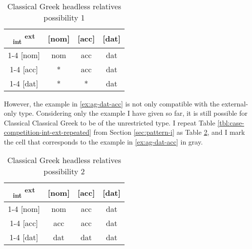 \begin{table}[ht]
  \center
  \caption{Classical Greek headless relatives possibility 1}
  \begin{tabular}{c|c|c|c}
    \toprule
    \textsubscript{\ac{int}} \textsuperscript{\ac{ext}}
           & [\ac{nom}]
           & [\ac{acc}]
           & [\ac{dat}]
           \\ \cmidrule{1-4}
       [\ac{nom}]
           & \ac{nom}
           & \ac{acc}
           & \ac{dat}
           \\ \cmidrule{1-4}
       [\ac{acc}]
           & *
           & \ac{acc}
           & \cellcolor{LG}\ac{dat}
           \\ \cmidrule{1-4}
       [\ac{dat}]
           & *
           & *
           & \ac{dat}
           \\
     \bottomrule
  \end{tabular}
    \label{tbl:case-competition-ag-poss1}
\end{table}

However, the example in \ref{ex:ag-dat-acc} is not only compatible with the external-only type. Considering only the example I have given so far, it is still possible for Classical Classical Greek to be of the unrestricted type. I repeat Table \ref{tbl:case-competition-int-ext-repeated} from Section \ref{sec:pattern-i} as Table \ref{tbl:case-competition-ag-poss2}, and I mark the cell that corresponds to the example in \ref{ex:ag-dat-acc} in gray.

\begin{table}[ht]
  \center
  \caption{Classical Greek headless relatives possibility 2}
  \begin{tabular}{c|c|c|c}
    \toprule
    \textsubscript{\ac{int}} \textsuperscript{\ac{ext}}
           & [\ac{nom}]
           & [\ac{acc}]
           & [\ac{dat}]
           \\ \cmidrule{1-4}
       [\ac{nom}]
           & \ac{nom}
           & \ac{acc}
           & \ac{dat}
           \\ \cmidrule{1-4}
       [\ac{acc}]
           & \ac{acc}
           & \ac{acc}
           & \cellcolor{LG}\ac{dat}
           \\ \cmidrule{1-4}
       [\ac{dat}]
           & \ac{dat}
           & \ac{dat}
           & \ac{dat}
           \\
     \bottomrule
  \end{tabular}
    \label{tbl:case-competition-ag-poss2}
\end{table}

